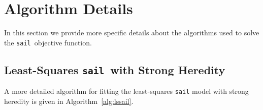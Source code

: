 \documentclass[12pt,letter]{article}\usepackage[]{graphicx}\usepackage[]{color}
\newcommand{\sail}{\texttt{sail}}
\begin{document}


\newpage
%
%



\newpage

\appendix
{}

\section{Algorithm Details}

In this section we provide more specific details about the algorithms used to solve the \sail ~objective function. 

\subsection{Least-Squares \sail ~with Strong Heredity} \label{ap:subsec:lssail}
A more detailed algorithm for fitting the least-squares \texttt{sail} model with strong heredity is given in Algorithm~\ref{alg:lssail}.
\end{document}
